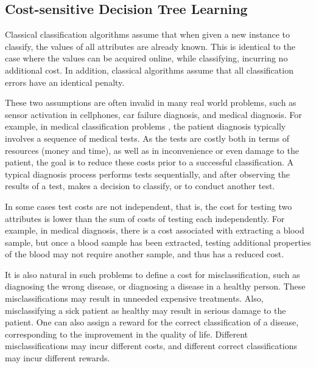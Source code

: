 \documentclass[letterpaper]{article}
\newcommand\commentout[1]{}
\theoremstyle{definition}
\begin{document}
\subsection{Cost-sensitive Decision Tree Learning}

Classical classification algorithms assume that when given a new instance to classify, the values of all attributes are already known. This is identical to the case where the values can be acquired online, while classifying, incurring no additional cost. In addition, classical algorithms assume that all classification errors have an identical penalty.

These two assumptions are often invalid in many real world problems, such as sensor activation in cellphones, car failure diagnosis, and medical diagnosis. For example, in medical classification problems \cite{turney1995cost}, the patient diagnosis typically involves a sequence of medical tests. As the tests are costly both in terms of resources (money and time), as well as in inconvenience or even damage to the patient, the goal is to reduce these costs prior to a successful classification. A typical diagnosis process performs tests sequentially, and after observing the results of a test, makes a decision to classify, or to conduct another test.

\commentout{
It is often the case that less costly tests are also less informative. Hence, a simple escalation strategy starts with the simplest and least informative tests and then moves to more costly tests if need be.
}
In some cases test costs are not independent, that is, the cost for testing two attributes is lower than the sum of costs of testing each independently. For example, in medical diagnosis, there is a cost associated with extracting a blood sample, but once a blood sample has been extracted, testing additional properties of the blood may not require another sample, and thus has a reduced cost.

It is also natural in such problems to define a cost for misclassification, such as diagnosing the wrong disease, or diagnosing a disease in a healthy person. These misclassifications may result in unneeded expensive treatments. Also, misclassifying a sick patient as healthy may result in serious damage to the  patient. One can also assign a reward for the correct classification of a disease, corresponding to the improvement in the quality of life. Different misclassifications may incur different costs, and different correct classifications may incur different rewards.
\end{document}
